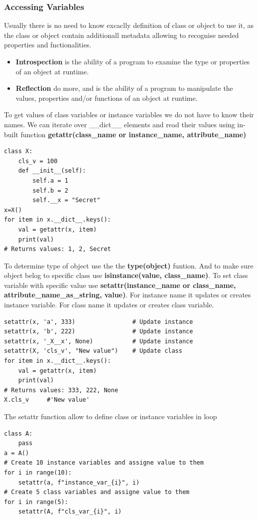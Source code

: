 \documentclass{article}
\begin{document}
\subsubsection{Accessing Variables}
Usually there is no need to know excaclly definition of class or object to use it, as the class or object contain additionall metadata allowing to recognise needed properties and fnctionalities.
\begin{itemize}
\item \textbf{Introspection} is the ability of a program to examine the type or properties of an object at runtime.
\item \textbf{Reflection} do more, and is the ability of a program to manipulate the values, properties and/or functions of an object at runtime.
\end{itemize}
To get values of class variables or instance variables we do not have to know their names. We can iterate over \_\_dict\_\_ elements and read their values using in-built function \textbf{getattr(class\_name or instance\_name, attribute\_name)}
\begin{lstlisting}[style=pystyle]
class X:
    cls_v = 100
    def __init__(self):
        self.a = 1
        self.b = 2
        self.__x = "Secret"
x=X()
for item in x.__dict__.keys():
    val = getattr(x, item)
    print(val)
# Returns values: 1, 2, Secret
\end{lstlisting}
To determine type of object use the the \textbf{type(object)} funtion. And to make sure object belog to specific class use \textbf{isinstance(value, class\_name)}. To set class variable with specific value use \textbf{setattr(instance\_name or  class\_name, attribute\_name\_as\_string, value)}. For instance name it updates or creates instance variable. For class name it updates or creates class variable.
\begin{lstlisting}[style=pystyle]
setattr(x, 'a', 333)				# Update instance
setattr(x, 'b', 222)				# Update instance
setattr(x, '_X__x', None)			# Update instance
setattr(X, 'cls_v', "New value")	# Update class
for item in x.__dict__.keys():
    val = getattr(x, item)
    print(val)
# Returns values: 333, 222, None
X.cls_v		#'New value'
\end{lstlisting}
The setattr function allow to define class or instance variables in loop
\begin{lstlisting}[style=pystyle]
class A:
	pass
a = A()
# Create 10 instance variables and assigne value to them
for i in range(10):
    setattr(a, f"instance_var_{i}", i)
# Create 5 class variables and assigne value to them
for i in range(5):
    setattr(A, f"cls_var_{i}", i)
\end{lstlisting}
\end{document}
